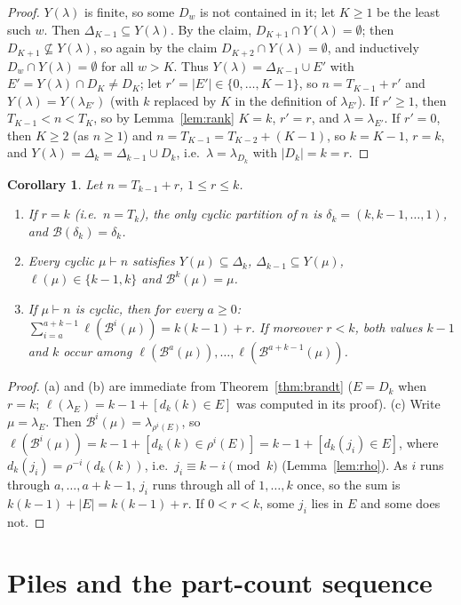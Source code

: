 \documentclass[11pt]{article}
\newtheorem{corollary}[theorem]{Corollary}
\theoremstyle{definition}
\newcommand{\B}{\mathcal{B}}
\renewcommand{\le}{\leqslant}
\renewcommand{\ge}{\geqslant}
\begin{document}
\begin{proof}
$Y(\lambda)$ is finite, so some $D_w$ is not contained in it; let $K\ge1$ be the least such $w$.  Then
$\Delta_{K-1}\subseteq Y(\lambda)$.  By the claim, $D_{K+1}\cap Y(\lambda)=\emptyset$; then $D_{K+1}\not\subseteq Y(\lambda)$, so
again by the claim $D_{K+2}\cap Y(\lambda)=\emptyset$, and inductively $D_w\cap Y(\lambda)=\emptyset$ for all $w>K$.  Thus
$Y(\lambda)=\Delta_{K-1}\cup E'$ with $E'=Y(\lambda)\cap D_K\ne D_K$; let $r'=|E'|\in\{0,\dots,K-1\}$, so
$n=T_{K-1}+r'$ and $Y(\lambda)=Y(\lambda_{E'})$ (with $k$ replaced by $K$ in the definition of $\lambda_{E'}$).
If $r'\ge1$, then $T_{K-1}<n<T_K$, so by Lemma~\ref{lem:rank} $K=k$, $r'=r$, and $\lambda=\lambda_{E'}$.
If $r'=0$, then $K\ge2$ (as $n\ge1$) and $n=T_{K-1}=T_{K-2}+(K-1)$, so $k=K-1$, $r=k$, and
$Y(\lambda)=\Delta_k=\Delta_{k-1}\cup D_k$, i.e.\ $\lambda=\lambda_{D_k}$ with $|D_k|=k=r$.
\end{proof}

\begin{corollary}\label{cor:cyc}
Let $n=T_{k-1}+r$, $1\le r\le k$.
\begin{enumerate}
\item[(a)] If $r=k$ (i.e.\ $n=T_k$), the only cyclic partition of $n$ is $\delta_k=(k,k-1,\dots,1)$, and
$\B(\delta_k)=\delta_k$.
\item[(b)] Every cyclic $\mu\vdash n$ satisfies $Y(\mu)\subseteq\Delta_k$, $\Delta_{k-1}\subseteq Y(\mu)$,
$\ell(\mu)\in\{k-1,k\}$ and $\B^k(\mu)=\mu$.
\item[(c)] If $\mu\vdash n$ is cyclic, then for every $a\ge0$:
$\sum_{i=a}^{a+k-1}\ell(\B^i(\mu))=k(k-1)+r$.  If moreover $r<k$, both values $k-1$ and $k$ occur among
$\ell(\B^a(\mu)),\dots,\ell(\B^{a+k-1}(\mu))$.
\end{enumerate}
\end{corollary}
\begin{proof}
(a) and (b) are immediate from Theorem~\ref{thm:brandt} ($E=D_k$ when $r=k$; $\ell(\lambda_E)=k-1+[d_k(k)\in E]$ was
computed in its proof).  (c) Write $\mu=\lambda_E$.  Then $\B^i(\mu)=\lambda_{\rho^i(E)}$, so
$\ell(\B^i(\mu))=k-1+[d_k(k)\in\rho^i(E)]=k-1+[d_k(j_i)\in E]$, where $d_k(j_i)=\rho^{-i}(d_k(k))$, i.e.\
$j_i\equiv k-i\pmod k$ (Lemma~\ref{lem:rho}).  As $i$ runs through $a,\dots,a+k-1$, $j_i$ runs through all
of $1,\dots,k$ once, so the sum is $k(k-1)+|E|=k(k-1)+r$.  If $0<r<k$, some $j_i$ lies in $E$ and some does not.
\end{proof}

\section{Piles and the part-count sequence}\label{sec:piles}
\end{document}
